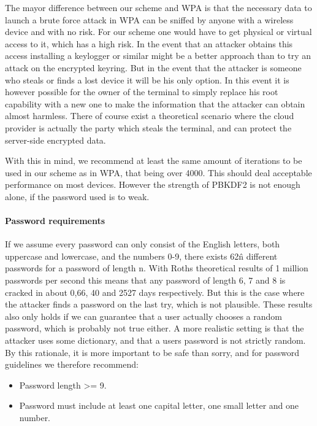 \documentclass[pdftex,english,10pt,b5paper,twoside]{book}
\begin{document}
The mayor difference between our scheme and WPA is that the necessary data to
launch a brute force attack in WPA can be sniffed by anyone with a wireless
device and with no risk. For our scheme one would have to get physical or
virtual access to it, which has a high risk. In the event that an attacker
obtains this access installing a keylogger or similar might be a better
approach than to try an attack on the encrypted keyring. But in the event that
the attacker is someone who steals or finds a lost device it will be his only
option. In this event it is however possible for the owner of the terminal to
simply replace his root capability with a new one to make the information that
the attacker can obtain almost harmless. There of course exist a theoretical
scenario where the cloud provider is actually the party which steals the
terminal, and can protect the server-side encrypted data.

With this in mind, we recommend at least the same amount of iterations
to be used in our scheme as in WPA, that being over 4000. This should deal
acceptable performance on most devices. However the strength of \ac{PBKDF2} is
not enough alone, if the password used is to weak.

\paragraph{Password requirements}

If we assume every password can only consist of the English letters, both
uppercase and lowercase, and the numbers 0-9, there exists 62\^n different
passwords for a password of length n. With Roths theoretical results of 1
million passwords per second this means that any password of length 6, 7 and 8
is cracked in about 0,66, 40 and 2527 days respectively. But this is the case
where the attacker finds a password on the last try, which is not plausible.
These results also only holds if we can guarantee that a user actually chooses
a random password, which is probably not true either. A more realistic setting
is that the attacker uses some dictionary, and that a users password is not
strictly random. By this rationale, it is more important to be safe than sorry,
and for password guidelines we therefore recommend:

\begin{itemize}
\item Password length >= 9.
\item Password must include at least one capital letter, one small letter and
one number.
\end{itemize}
\end{document}
